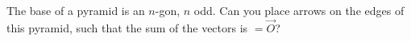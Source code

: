 The base of a pyramid is an $n$-gon, $n$ odd. Can you place arrows on the edges of this pyramid, such that the sum of the vectors is $= \vec O$?

